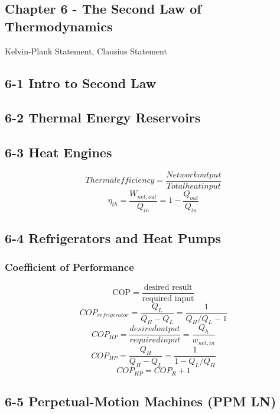 \documentclass[10pt,landscape]{article}
\begin{document}
\begin{multicols}{3}
\section{Chapter 6 - The Second Law of Thermodynamics}
Kelvin-Plank Statement, Clausius Statement
\subsection{6-1 Intro to Second Law}
\subsection{6-2 Thermal Energy Reservoirs}
\subsection{6-3 Heat Engines}
\begin{equation}
    Thermal efficiency = \frac{Net work output}{Total heat input}
\end{equation}
\begin{equation}
    \eta_{th}=\frac{W_{net,out}}{Q_{in}}=1-\frac{Q_{out}}{Q_{in}}
\end{equation}
\subsection{6-4 Refrigerators and Heat Pumps}
\subsubsection{Coefficient of Performance}
\begin{equation}
    \text{COP}=\frac{\text{desired result}}{\text{required input}}
\end{equation}
\begin{equation}
     COP_{refrigerator}=\frac{Q_L}{Q_H-Q_L}=\frac{1}{Q_H/Q_L-1}
\end{equation}
\begin{equation}
    COP_{HP}=\frac{desired output}{required input}=\frac{Q_h}{w_{net,in}}
\end{equation}
\begin{equation}
    COP_{HP}=\frac{Q_H}{Q_H-Q_L}=\frac{1}{1-Q_L/Q_H}
\end{equation}
\begin{equation}
    COP_{HP}=COP_R+1
\end{equation}
\subsection{6-5 Perpetual-Motion Machines (PPM LN)}

\end{multicols}
\end{document}
